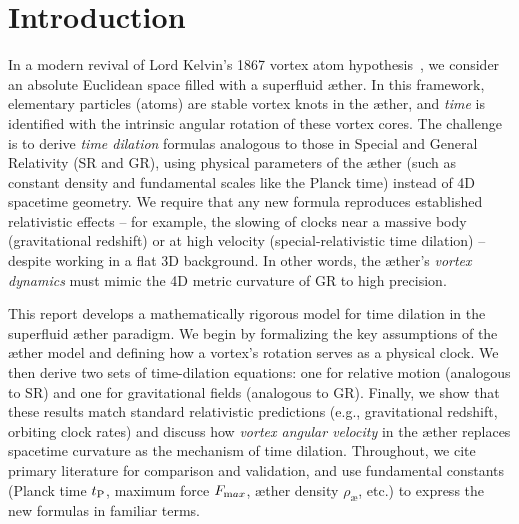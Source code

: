 
\section{Introduction}
In a modern revival of Lord Kelvin’s 1867 vortex atom hypothesis~\cite{Kelvin1867-vortex}, we consider an absolute Euclidean space filled with a superfluid æther. In this framework, elementary particles (atoms) are stable vortex knots in the æther, and \emph{time} is identified with the intrinsic angular rotation of these vortex cores. The challenge is to derive \emph{time dilation} formulas analogous to those in Special and General Relativity (SR and GR), using physical parameters of the æther (such as constant density and fundamental scales like the Planck time) instead of 4D spacetime geometry. We require that any new formula reproduces established relativistic effects – for example, the slowing of clocks near a massive body (gravitational redshift) or at high velocity (special-relativistic time dilation) – despite working in a flat 3D background. In other words, the æther’s \emph{vortex dynamics} must mimic the 4D metric curvature of GR to high precision.

This report develops a mathematically rigorous model for time dilation in the superfluid æther paradigm. We begin by formalizing the key assumptions of the æther model and defining how a vortex’s rotation serves as a physical clock. We then derive two sets of time-dilation equations: one for relative motion (analogous to SR) and one for gravitational fields (analogous to GR). Finally, we show that these results match standard relativistic predictions (e.g., gravitational redshift, orbiting clock rates) and discuss how \emph{vortex angular velocity} in the æther replaces spacetime curvature as the mechanism of time dilation. Throughout, we cite primary literature for comparison and validation, and use fundamental constants (Planck time $t_{\textrm P}$, maximum force $F_{\textrm max}$, æther density $\rho_{\text{\ae}}$, etc.) to express the new formulas in familiar terms.